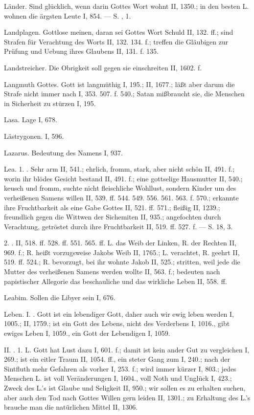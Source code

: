 Länder. Sind glücklich, wenn darin Gottes Wort wohnt II, 1350.; in den besten L. wohnen die ärgsten Leute I, 854. — S. ,  1.

Landplagen. Gottlose meinen, daran sei Gottes Wort Schuld II, 132. ff.; sind Strafen für Verachtung des Worts II, 132. 134. f.; treffen die Gläubigen zur Prüfung und Uebung ihres Glaubens II, 131. f. 135.

Landstreicher. Die Obrigkeit soll gegen sie einschreiten II, 1602. f.

Langmuth Gottes. Gott ist langmüthig I, 195.; II, 1677.; läßt aber darum die Strafe nicht immer nach I, 353. 507. f. 540.; Satan mißbraucht sie, die Menschen in Sicherheit zu stürzen I, 195.

Lasa. Lage I, 678.

Lästrygonen. I, 596.

Lazarus. Bedeutung des Namens I, 937.

Lea. 1. . Sehr arm II, 541.; ehrlich, fromm, stark, aber nicht schön II, 491. f.; worin ihr blödes Gesicht bestand II, 491. f.; eine gottselige Hausmutter II, 540.; keusch und fromm, suchte nicht fleischliche Wohllust, sondern Kinder um des verheißenen Samens willen II, 539. ff. 544. 549. 556. 561. 563. f. 570.; erkannte ihre Fruchtbarkeit als eine Gabe Gottes II, 521. ff. 571.; fleißig II, 1239.; freundlich gegen die Wittwen der Sichemiten II, 935.; angefochten durch Verachtung, getröstet durch ihre Fruchtbarkeit II, 519. ff. 527. f. — S.  18,  3.

2. . II, 518. ff. 528. ff. 551. 565. ff. L. das Weib der Linken, R. der Rechten II, 969. f.; R. heißt vorzugsweise Jakobs Weib II, 1765.; L. verachtet, R. geehrt II, 519. ff. 524.; R. bevorzugt, bei ihr wohnte Jakob II, 525.; stritten, weil jede die Mutter des verheißenen Samens werden wollte II, 563. f.; bedeuten nach papistischer Allegorie das beschauliche und das wirkliche Leben II, 558. ff.

Leabim. Sollen die Libyer sein I, 676.

Leben. I. . Gott ist ein lebendiger Gott, daher auch wir ewig leben werden I, 1005.; II, 1759.; ist ein Gott des Lebens, nicht des Verderbens I, 1016., gibt ewiges Leben I, 1059., ein Gott der Lebendigen I, 1059.

II. . 1.  L. Gott hat Lust dazu I, 601. f.; damit ist kein ander Gut zu vergleichen I, 269.; ist ein eitler Traum II, 1054. ff., ein steter Gang zum  I, 240.; nach der Sintfluth mehr Gefahren als vorher I, 253. f.; wird immer kürzer I, 803.; jedes Menschen L. ist voll Veränderungen I, 1604., voll Noth und Unglück I, 423.; Zweck des L.’s ist Glaube und Seligkeit II, 950.; wir sollen es zu erhalten suchen, aber auch den Tod nach Gottes Willen gern leiden II, 1301.; zu Erhaltung des L.’s brauche man die natürlichen Mittel II, 1306.

